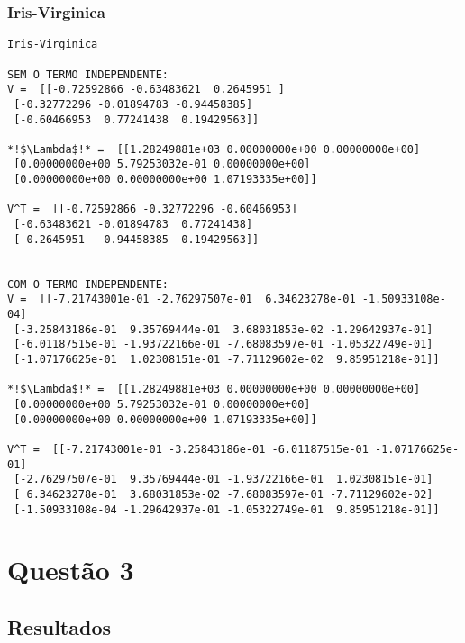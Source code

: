 \documentclass[a4paper,12pt,twoside]{article}
\begin{document}
\subsubsection{Iris-Virginica}

\begin{lstlisting}
Iris-Virginica

SEM O TERMO INDEPENDENTE: 
V =  [[-0.72592866 -0.63483621  0.2645951 ]
 [-0.32772296 -0.01894783 -0.94458385]
 [-0.60466953  0.77241438  0.19429563]]

*!$\Lambda$!* =  [[1.28249881e+03 0.00000000e+00 0.00000000e+00]
 [0.00000000e+00 5.79253032e-01 0.00000000e+00]
 [0.00000000e+00 0.00000000e+00 1.07193335e+00]]

V^T =  [[-0.72592866 -0.32772296 -0.60466953]
 [-0.63483621 -0.01894783  0.77241438]
 [ 0.2645951  -0.94458385  0.19429563]]


COM O TERMO INDEPENDENTE: 
V =  [[-7.21743001e-01 -2.76297507e-01  6.34623278e-01 -1.50933108e-04]
 [-3.25843186e-01  9.35769444e-01  3.68031853e-02 -1.29642937e-01]
 [-6.01187515e-01 -1.93722166e-01 -7.68083597e-01 -1.05322749e-01]
 [-1.07176625e-01  1.02308151e-01 -7.71129602e-02  9.85951218e-01]]

*!$\Lambda$!* =  [[1.28249881e+03 0.00000000e+00 0.00000000e+00]
 [0.00000000e+00 5.79253032e-01 0.00000000e+00]
 [0.00000000e+00 0.00000000e+00 1.07193335e+00]]

V^T =  [[-7.21743001e-01 -3.25843186e-01 -6.01187515e-01 -1.07176625e-01]
 [-2.76297507e-01  9.35769444e-01 -1.93722166e-01  1.02308151e-01]
 [ 6.34623278e-01  3.68031853e-02 -7.68083597e-01 -7.71129602e-02]
 [-1.50933108e-04 -1.29642937e-01 -1.05322749e-01  9.85951218e-01]]
\end{lstlisting}

\section{Questão 3}
\subsection{Resultados}
\end{document}
